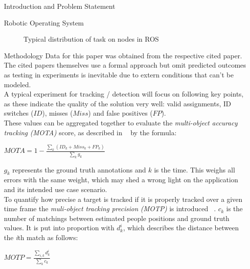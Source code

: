 \documentclass[a4paper,oneside,10pt,DIV12,headsepline,footexclude,headexclude]{scrartcl}
\begin{document}
\begin{section}{Introduction and Problem Statement}
\begin{subsection}{Robotic Operating System}
\begin{center}
\begin{figure}[h]
\centering
{}
\caption{Typical distribution of task on nodes in ROS}
\label{fig:ros}
\end{figure}
\end{center}
\end{subsection}


\end{section}
\begin{section}{Methodology}
Data for this paper was obtained from the respective cited paper.\\
The cited papers themselves use a formal approach but omit predicted outcomes as
testing in experiments is inevitable due to extern conditions that can't be modeled.\\
A typical experiment for tracking / detection will focus on following key points, 
as these indicate the quality of the solution very well: valid assignments, 
ID switches ($ID$), misses ($Miss$)  and false positives ($FP$).\\
These values can be aggregated together to evaluate the \textit{multi-object accuracy tracking (MOTA)} score,
as described in ~\cite{7139259} by the formula: 
\begin{center}
$MOTA = 1 - \frac{\sum_{k}(ID_{k}+Miss_{k}+FP_{k})}{\sum_{k}g_{k}}$
\end{center}
$g_{k}$ represents the ground truth annotations and $k$ is the time. This weighs
all errors with the same weight, which may shed a wrong light on the application
and its intended use case scenario.\\
To quantify how precise a target is tracked if it is properly tracked over a given
time frame the \textit{muli-object tracking precision (MOTP)} is introduced ~\cite{7139259}.
$c_{k}$ is the number of matchings between estimated people positions and ground truth values.
It is put into proportion with $d_{k}^{i}$, which describes the distance between the \textit{i}th match
as follows:
\begin{center}
$MOTP = \frac{\sum_{i,k}d_{k}^{i}}{\sum_{k}c_{k}}$
\end{center}

\end{section}
\end{document}
